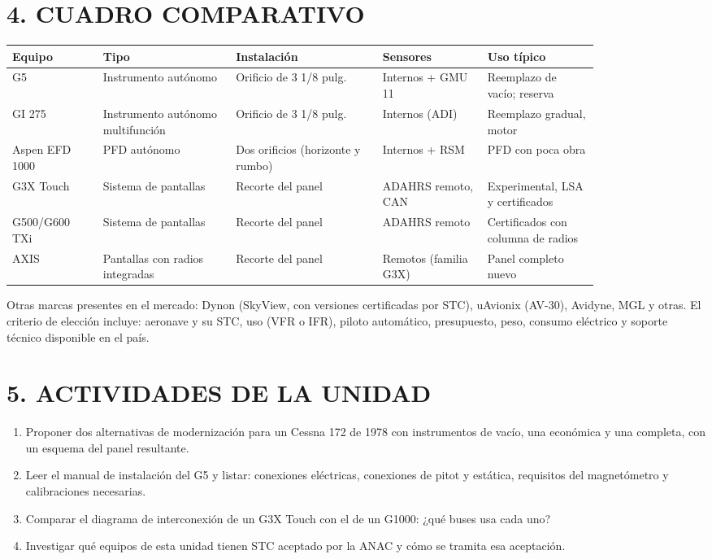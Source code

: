 \section*{4. CUADRO COMPARATIVO}
\begin{center}
\footnotesize
\begin{tabular}{|>{\raggedright\arraybackslash}p{0.13\linewidth}|>{\raggedright\arraybackslash}p{0.19\linewidth}|>{\raggedright\arraybackslash}p{0.21\linewidth}|>{\raggedright\arraybackslash}p{0.15\linewidth}|>{\raggedright\arraybackslash}p{0.16\linewidth}|}
\hline
\textbf{Equipo} & \textbf{Tipo} & \textbf{Instalación} & \textbf{Sensores} & \textbf{Uso típico} \\
\hline
G5 & Instrumento autónomo & Orificio de 3 1/8 pulg. & Internos + GMU 11 & Reemplazo de vacío;
reserva \\ \hline
GI 275 & Instrumento autónomo multifunción & Orificio de 3 1/8 pulg. & Internos (ADI) & Reemplazo
gradual, motor \\ \hline
Aspen EFD 1000 & PFD autónomo & Dos orificios (horizonte y rumbo) & Internos + RSM & PFD con
poca obra \\ \hline
G3X Touch & Sistema de pantallas & Recorte del panel & ADAHRS remoto, CAN & Experimental, LSA y
certificados \\ \hline
G500/G600 TXi & Sistema de pantallas & Recorte del panel & ADAHRS remoto & Certificados con
columna de radios \\ \hline
AXIS & Pantallas con radios integradas & Recorte del panel & Remotos (familia G3X) & Panel
completo nuevo \\ \hline
\end{tabular}
\end{center}
Otras marcas presentes en el mercado: Dynon (SkyView, con versiones certificadas por STC), uAvionix
(AV-30), Avidyne, MGL y otras. El criterio de elección incluye: aeronave y su STC, uso (VFR o IFR),
piloto automático, presupuesto, peso, consumo eléctrico y soporte técnico disponible en el país.

\section*{5. ACTIVIDADES DE LA UNIDAD}
\begin{enumerate}
  \item Proponer dos alternativas de modernización para un Cessna 172 de 1978 con instrumentos de
        vacío, una económica y una completa, con un esquema del panel resultante.
  \item Leer el manual de instalación del G5 y listar: conexiones eléctricas, conexiones de pitot y
        estática, requisitos del magnetómetro y calibraciones necesarias.
  \item Comparar el diagrama de interconexión de un G3X Touch con el de un G1000: ¿qué buses usa
        cada uno?
  \item Investigar qué equipos de esta unidad tienen STC aceptado por la ANAC y cómo se tramita
        esa aceptación.
\end{enumerate}
